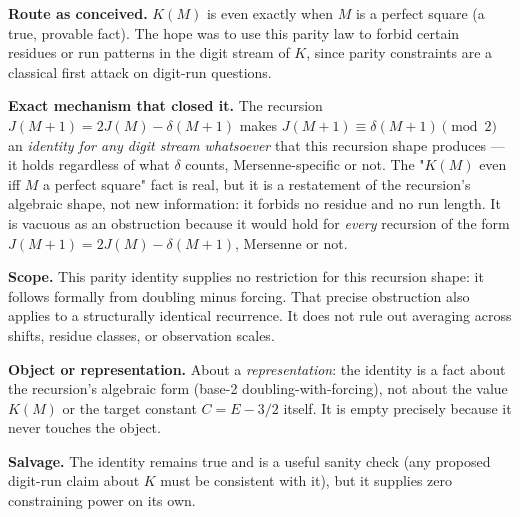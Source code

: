 \begin{obs}
\label{obs:parity-squares}
\textbf{Route as conceived.} $K(M)$ is even exactly when $M$ is a perfect square (a true,
provable fact). The hope was to use this parity law to forbid certain residues or run patterns in
the digit stream of $K$, since parity constraints are a classical first attack on digit-run
questions.

\textbf{Exact mechanism that closed it.} The recursion $J(M+1) = 2J(M) - \delta(M+1)$ makes
$J(M+1)\equiv\delta(M+1)\pmod 2$ an \emph{identity for any digit stream whatsoever} that this
recursion shape produces — it holds regardless of what $\delta$ counts, Mersenne-specific or not.
The "$K(M)$ even iff $M$ a perfect square" fact is real, but it is a restatement of the recursion's
algebraic shape, not new information: it forbids no residue and no run length. It is vacuous as an
obstruction because it would hold for \emph{every} recursion of the form $J(M+1)=2J(M)-\delta(M+1)$,
Mersenne or not.

\textbf{Scope.} This parity identity supplies no restriction for this recursion shape: it follows
formally from doubling minus forcing. That precise obstruction also applies to a structurally
identical recurrence. It does not rule out averaging across shifts, residue classes, or
observation scales.

\textbf{Object or representation.} About a \emph{representation}: the identity is a fact about the
recursion's algebraic form (base-2 doubling-with-forcing), not about the value $K(M)$ or the
target constant $C=E-3/2$ itself. It is empty precisely because it never touches the object.

\textbf{Salvage.} The identity remains true and is a useful sanity check (any proposed digit-run
claim about $K$ must be consistent with it), but it supplies zero constraining power on its own.
\end{obs}

